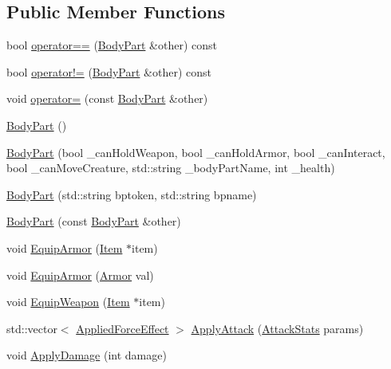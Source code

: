 \subsection*{Public Member Functions}
\begin{DoxyCompactItemize}
\item 
bool \mbox{\hyperlink{class_body_part_a9fa30957d2740122ef8d3bf1905c2dda}{operator==}} (\mbox{\hyperlink{class_body_part}{Body\+Part}} \&other) const
\item 
bool \mbox{\hyperlink{class_body_part_aa5df801cc11333d0adeaa5235c70bc7c}{operator!=}} (\mbox{\hyperlink{class_body_part}{Body\+Part}} \&other) const
\item 
void \mbox{\hyperlink{class_body_part_af4df2320cea8651ff589a57778ba4eee}{operator=}} (const \mbox{\hyperlink{class_body_part}{Body\+Part}} \&other)
\item 
\mbox{\hyperlink{class_body_part_a9599eb919a1223d5597f85fedd74085a}{Body\+Part}} ()
\item 
\mbox{\hyperlink{class_body_part_a84e12a892612a548a4fd605835290557}{Body\+Part}} (bool \+\_\+can\+Hold\+Weapon, bool \+\_\+can\+Hold\+Armor, bool \+\_\+can\+Interact, bool \+\_\+can\+Move\+Creature, std\+::string \+\_\+body\+Part\+Name, int \+\_\+health)
\item 
\mbox{\hyperlink{class_body_part_ac09038a5c7837d63f5f2b97747a88854}{Body\+Part}} (std\+::string bptoken, std\+::string bpname)
\item 
\mbox{\hyperlink{class_body_part_a605504c8f1ce6c8977c409c052b82633}{Body\+Part}} (const \mbox{\hyperlink{class_body_part}{Body\+Part}} \&other)
\item 
void \mbox{\hyperlink{class_body_part_aa12ae5563a19cabd664731bbba3c7ea6}{Equip\+Armor}} (\mbox{\hyperlink{class_item}{Item}} $\ast$item)
\item 
void \mbox{\hyperlink{class_body_part_a651b65c40c95ecad5a8388736d6cc73a}{Equip\+Armor}} (\mbox{\hyperlink{class_armor}{Armor}} val)
\item 
void \mbox{\hyperlink{class_body_part_a6af5139c60c7b96bff6d8768c9ef8f22}{Equip\+Weapon}} (\mbox{\hyperlink{class_item}{Item}} $\ast$item)
\item 
std\+::vector$<$ \mbox{\hyperlink{struct_applied_force_effect}{Applied\+Force\+Effect}} $>$ \mbox{\hyperlink{class_body_part_aed6e734467a8cd25b4be8bc18edc9033}{Apply\+Attack}} (\mbox{\hyperlink{struct_attack_stats}{Attack\+Stats}} params)
\item 
void \mbox{\hyperlink{class_body_part_ae8ee6c320cd7ad82ec2c674357d16b80}{Apply\+Damage}} (int damage)

\end{DoxyCompactItemize}
